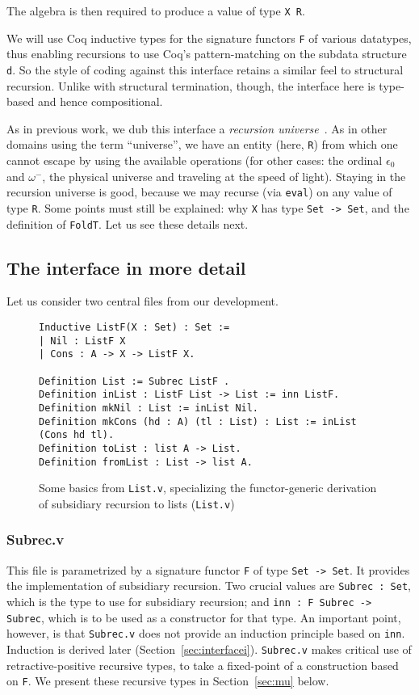 \documentclass[a4paper,USenglish]{lipics-v2021}
\begin{document}
\noindent The algebra is then required to produce a value of type \verb|X R|.

We will use Coq inductive types for the signature functors \verb|F| of
various datatypes, thus enabling recursions to use Coq's
pattern-matching on the subdata structure \verb|d|.  So the style of
coding against this interface retains a similar feel to structural
recursion.  Unlike with structural termination, though, the interface
here is type-based and hence compositional.  

As in previous work, we dub this interface a \emph{recursion
universe}~\cite{stump20}.  As in other domains using the term
``universe'', we have an entity (here, \verb|R|) from which one cannot
escape by using the available operations (for other cases:
the ordinal $\epsilon_0$ and $\omega^-$, the physical universe and traveling at
the speed of light).  Staying in the recursion universe is good,
because we may recurse (via \verb|eval|) on any value of type
\verb|R|.  Some points must still be explained: why \verb|X| has type \verb|Set -> Set|,
and the definition of \verb|FoldT|.  Let us see these details next.

\subsection{The interface in more detail}

Let us consider two central files from our development.

\begin{figure}
  \begin{verbatim}
Inductive ListF(X : Set) : Set :=
| Nil : ListF X
| Cons : A -> X -> ListF X.

Definition List := Subrec ListF .
Definition inList : ListF List -> List := inn ListF.
Definition mkNil : List := inList Nil.
Definition mkCons (hd : A) (tl : List) : List := inList (Cons hd tl).
Definition toList : list A -> List.
Definition fromList : List -> list A.
\end{verbatim}
  \caption{Some basics from \texttt{List.v}, specializing the functor-generic derivation of subsidiary recursion to lists (\texttt{List.v})}
  \label{fig:listf}
\end{figure}

\subsubsection{Subrec.v}

  This file is parametrized by a signature functor \verb|F| of type
  \verb|Set -> Set|.  It provides the implementation of subsidiary
  recursion.  Two crucial values are \verb|Subrec : Set|, which is the
  type to use for subsidiary recursion; and
  \verb|inn : F Subrec -> Subrec|, which is to be used as a
  constructor for that type.  An important point, however, is that
  \verb|Subrec.v| does not provide an induction principle based on
  \verb|inn|.  Induction is derived later
  (Section~\ref{sec:interfacei}). \verb|Subrec.v| makes critical use
  of retractive-positive recursive types, to take a fixed-point of a
  construction based on \verb|F|.  We present these recursive
  types in Section~\ref{sec:mu} below.
\end{document}
